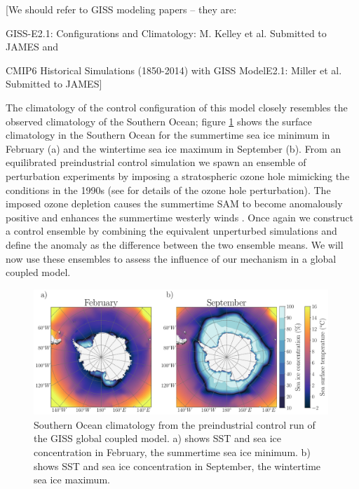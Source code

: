\documentclass{ametsocV5}
\begin{document}
[We should refer to GISS modeling papers -- they are:

GISS-E2.1: Configurations and Climatology: M. Kelley et al. Submitted to JAMES and

CMIP6 Historical Simulations (1850-2014) with GISS ModelE2.1: Miller et al.
Submitted to JAMES]

The climatology of the control configuration of this model closely resembles the observed climatology of the Southern Ocean; figure \ref{fig:GISS_overview} shows the surface climatology in the Southern Ocean for the summertime sea ice minimum in February (a) and the wintertime sea ice maximum in September (b). From an equilibrated preindustrial control simulation we spawn an ensemble of perturbation experiments by imposing a stratospheric ozone hole mimicking the conditions in the 1990s (see \citet{Doddridge2019a} for details of the ozone hole perturbation). The imposed ozone depletion causes the summertime SAM to become anomalously positive and enhances the summertime westerly winds \citep{Polvani2011}. Once again we construct a control ensemble by combining the equivalent unperturbed simulations and define the anomaly as the difference between the two ensemble means. We will now use these ensembles to assess the influence of our mechanism in a global coupled model.






\begin{figure}[!ht]
    \begin{center}
        \includegraphics[width=0.99\textwidth]{figures/GISS_overview.pdf}
        \caption{Southern Ocean climatology from the preindustrial control run of the GISS global coupled model. a) shows SST and sea ice concentration in February, the summertime sea ice minimum. b) shows SST and sea ice concentration in September, the wintertime sea ice maximum.}
        \label{fig:GISS_overview}
    \end{center}
\end{figure}
\end{document}
